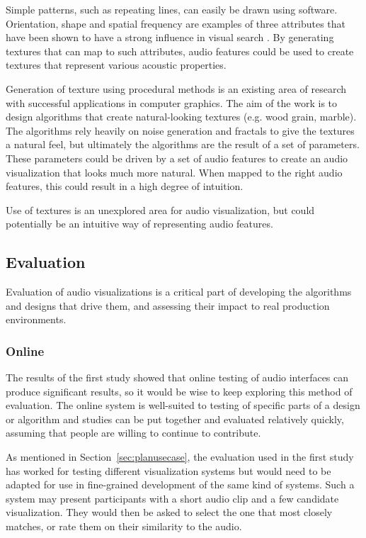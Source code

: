 Simple patterns, such as repeating lines, can easily be drawn using software.
Orientation, shape and spatial frequency are examples of three attributes that
have been shown to have a strong influence in visual search \cite{Wolfe2004}.
By generating textures that can map to such attributes, audio features could be
used to create textures that represent various acoustic properties.

Generation of texture using procedural methods is an existing area of research
\cite{Ebert1994} with successful applications in computer graphics. The aim of
the work is to design algorithms that create natural-looking textures (e.g.
wood grain, marble). The algorithms rely heavily on noise generation and
fractals to give the textures a natural feel, but ultimately the algorithms are
the result of a set of parameters. These parameters could be driven by a set of
audio features to create an audio visualization that looks much more natural.
When mapped to the right audio features, this could result in a high degree
of intuition.

Use of textures is an unexplored area for audio visualization, but could
potentially be an intuitive way of representing audio features.

\subsection{Evaluation}\label{sec:planeval}
Evaluation of audio visualizations is a critical part of developing the
algorithms and designs that drive them, and assessing their impact to real
production environments.

\subsubsection{Online}\label{sec:planonline}
The results of the first study showed that online testing of audio interfaces
can produce significant results, so it would be wise to keep exploring this
method of evaluation. The online system is well-suited to testing of specific
parts of a design or algorithm and studies can be put together and evaluated
relatively quickly, assuming that people are willing to continue to contribute.

As mentioned in Section~\ref{sec:planusecase}, the evaluation used in the first
study has worked for testing different visualization systems but would need to
be adapted for use in fine-grained development of the same kind of systems.
Such a system may present participants with a short audio clip and a few
candidate visualization. They would then be asked to select the one that most
closely matches, or rate them on their similarity to the audio.

